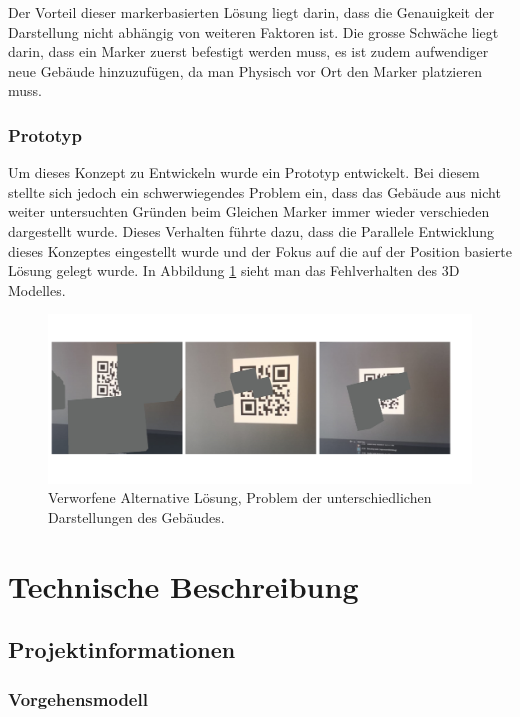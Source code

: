 \documentclass[a4paper]{scrreprt}
\begin{document}
Der Vorteil dieser markerbasierten Lösung liegt darin, dass die Genauigkeit der Darstellung nicht abhängig von weiteren Faktoren ist. Die grosse Schwäche liegt darin, dass ein Marker zuerst befestigt werden muss, es ist zudem aufwendiger neue Gebäude hinzuzufügen, da man Physisch vor Ort den Marker platzieren muss.

\subsection{Prototyp}
Um dieses Konzept zu Entwickeln wurde ein Prototyp entwickelt. Bei diesem stellte sich jedoch ein schwerwiegendes Problem ein, dass das Gebäude aus nicht weiter untersuchten Gründen beim Gleichen Marker immer wieder verschieden dargestellt wurde. Dieses Verhalten führte dazu, dass die Parallele Entwicklung dieses Konzeptes eingestellt wurde und der Fokus auf die auf der Position basierte Lösung gelegt wurde. In Abbildung \ref{fig:alternativeSolution} sieht man das Fehlverhalten des 3D Modelles.

\begin{figure}[h!]
	\includegraphics[keepaspectratio, width=\textwidth]{alternativeLoesung.png}
	\caption{Verworfene Alternative Lösung, Problem der unterschiedlichen Darstellungen des Gebäudes.}
    \label{fig:alternativeSolution}
\end{figure}

\chapter{Technische Beschreibung}
\section{Projektinformationen}


\subsection{Vorgehensmodell}
\end{document}
